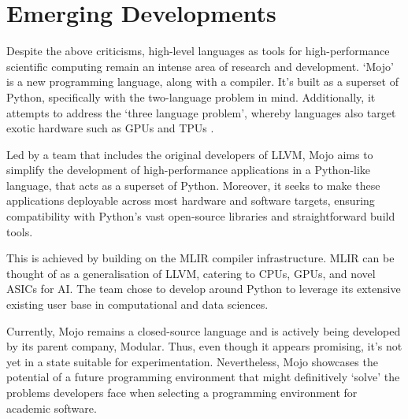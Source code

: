 \section{Emerging Developments}\label{chpt:1:sec:3}

Despite the above criticisms, high-level languages as tools for high-performance scientific computing remain an intense area of research and development. `Mojo' is a new programming language, along with a compiler. It's built as a superset of Python, specifically with the two-language problem in mind. Additionally, it attempts to address the `three language problem', whereby languages also target exotic hardware such as GPUs and TPUs \cite{Lattner2023Mojo}.

Led by a team that includes the original developers of LLVM, Mojo aims to simplify the development of high-performance applications in a Python-like language, that acts as a superset of Python. Moreover, it seeks to make these applications deployable across most hardware and software targets, ensuring compatibility with Python's vast open-source libraries and straightforward build tools.

This is achieved by building on the MLIR compiler infrastructure. MLIR can be thought of as a generalisation of LLVM, catering to CPUs, GPUs, and novel ASICs for AI. The team chose to develop around Python to leverage its extensive existing user base in computational and data sciences.

Currently, Mojo remains a closed-source language and is actively being developed by its parent company, Modular. Thus, even though it appears promising, it's not yet in a state suitable for experimentation. Nevertheless, Mojo showcases the potential of a future programming environment that might definitively `solve' the problems developers face when selecting a programming environment for academic software.